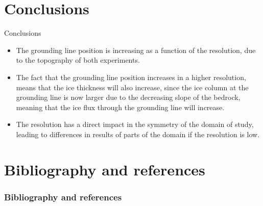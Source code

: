 \documentclass[11pt]{beamer}
\begin{document}
	\section{Conclusions}
		\begin{frame}{Conclusions}
		\begin{itemize}
			\justifying
			\item The grounding line position is increasing as a function of the resolution, due to the topography of both experiments.
			\item The fact that the grounding line position increases in a higher resolution, means that the ice thickness will also increase, since the ice column at the grounding line is now larger due to the decreasing slope of the bedrock, meaning that the ice flux through the grounding line will increase.
			\item The resolution has a direct impact in the symmetry of the domain of study, leading to differences in results of parts of the domain if the resolution is low.
		\end{itemize}
		\end{frame}
	\section{Bibliography and references}
		\begin{frame}[allowframebreaks]
		\frametitle{Bibliography and references}
			
			
		\end{frame}
\end{document}

